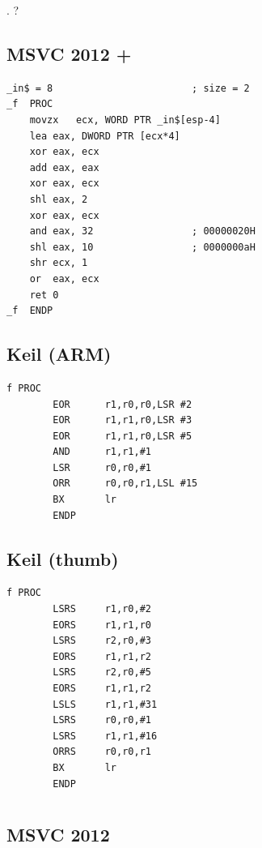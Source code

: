 .
?

\subsection{MSVC 2012 + \Ox}

\begin{lstlisting}
_in$ = 8						; size = 2
_f	PROC
	movzx	ecx, WORD PTR _in$[esp-4]
	lea	eax, DWORD PTR [ecx*4]
	xor	eax, ecx
	add	eax, eax
	xor	eax, ecx
	shl	eax, 2
	xor	eax, ecx
	and	eax, 32					; 00000020H
	shl	eax, 10					; 0000000aH
	shr	ecx, 1
	or	eax, ecx
	ret	0
_f	ENDP
\end{lstlisting}

\subsection{Keil (ARM)}

\begin{lstlisting}
f PROC
        EOR      r1,r0,r0,LSR #2
        EOR      r1,r1,r0,LSR #3
        EOR      r1,r1,r0,LSR #5
        AND      r1,r1,#1
        LSR      r0,r0,#1
        ORR      r0,r0,r1,LSL #15
        BX       lr
        ENDP
\end{lstlisting}

\subsection{Keil (thumb)}

\begin{lstlisting}
f PROC
        LSRS     r1,r0,#2
        EORS     r1,r1,r0
        LSRS     r2,r0,#3
        EORS     r1,r1,r2
        LSRS     r2,r0,#5
        EORS     r1,r1,r2
        LSLS     r1,r1,#31
        LSRS     r0,r0,#1
        LSRS     r1,r1,#16
        ORRS     r0,r0,r1
        BX       lr
        ENDP
\end{lstlisting}

\section{}


\subsection{MSVC 2012}


